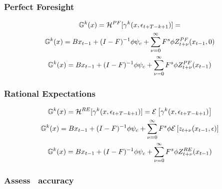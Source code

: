\documentclass[tikz]{beamer}
\begin{document}
\begin{frame}
\frametitle{Perfect Foresight}




\begin{gather}
\XZFunc^{k}(x)=     \mathcal{H}^{PF}[\xzFunc^{k}(x,\epsilon_{t+T-k+1})]=\\
\XZFunc^{k}(x)=\EsumLinPart +   \EsumZPartZero\\
 \XZFunc^{k}(x)=\EsumLinPart + \EsumCapZPart{PF}
\end{gather}

\end{frame}
\begin{frame}
  
 \frametitle{Rational Expectations}

 \begin{gather}
 \XZFunc^{k}(x)=     \mathcal{H}^{RE}[\xzFunc^{k}(x,\epsilon_{t+T-k+1})]=
 \expct{\xzFunc^{k}(x,\epsilon_{t+T-k+1})}\\
  \XZFunc^{k}(x)=\EsumLinPart + \EsumZPartEpsilon\\
 \XZFunc^{k}(x)=\EsumLinPart + \EsumCapZPart{RE}
 \end{gather}

\end{frame}

\begin{frame}
  \frametitle{Assess \ADR\  accuracy}
\end{frame}
\end{document}
